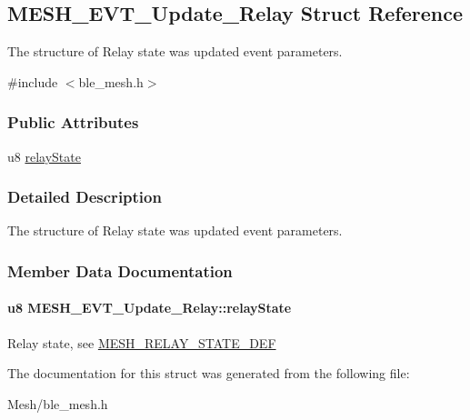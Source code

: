 \hypertarget{struct_m_e_s_h___e_v_t___update___relay}{}\subsection{M\+E\+S\+H\+\_\+\+E\+V\+T\+\_\+\+Update\+\_\+\+Relay Struct Reference}
\label{struct_m_e_s_h___e_v_t___update___relay}


The structure of Relay state was updated event parameters.  




{\ttfamily \#include $<$ble\+\_\+mesh.\+h$>$}

\subsubsection*{Public Attributes}
\begin{DoxyCompactItemize}
\item 
u8 \hyperlink{struct_m_e_s_h___e_v_t___update___relay_a2bb57ff7daf064c15f4988e9d47eaa64}{relay\+State}
\end{DoxyCompactItemize}


\subsubsection{Detailed Description}
The structure of Relay state was updated event parameters. 

\subsubsection{Member Data Documentation}
\paragraph[{\texorpdfstring{relay\+State}{relayState}}]{\setlength{\rightskip}{0pt plus 5cm}u8 M\+E\+S\+H\+\_\+\+E\+V\+T\+\_\+\+Update\+\_\+\+Relay\+::relay\+State}\hypertarget{struct_m_e_s_h___e_v_t___update___relay_a2bb57ff7daf064c15f4988e9d47eaa64}{}\label{struct_m_e_s_h___e_v_t___update___relay_a2bb57ff7daf064c15f4988e9d47eaa64}
Relay state, see \hyperlink{group___m_e_s_h___r_e_l_a_y___s_t_a_t_e___d_e_f}{M\+E\+S\+H\+\_\+\+R\+E\+L\+A\+Y\+\_\+\+S\+T\+A\+T\+E\+\_\+\+D\+EF} 

The documentation for this struct was generated from the following file\+:\begin{DoxyCompactItemize}
\item 
Mesh/ble\+\_\+mesh.\+h\end{DoxyCompactItemize}
